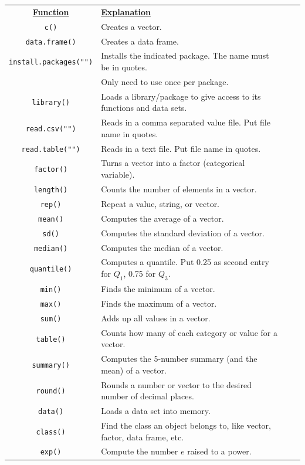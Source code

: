\documentclass[11pt]{article}
\begin{document}
\begin{longtable}{clcc}
	\underline{\bf Function} & \underline{\bf Explanation}\\
	\texttt{c()} & Creates a vector.\\
	\texttt{data.frame()} & Creates a data frame.\\
	\texttt{install.packages("")} & Installs the indicated package. The name must be in quotes.\\
	& Only need to use once per package.\\
	\texttt{library()} & Loads a library/package to give access to its functions and data sets.\\
	\texttt{read.csv("")} & Reads in a comma separated value file. Put file name in quotes.\\
	\texttt{read.table("")} & Reads in a text file. Put file name in quotes.\\
	\texttt{factor()} & Turns a vector into a factor (categorical variable).\\
	\texttt{length()} &  Counts the number of elements in a vector.\\
	\texttt{rep()} & Repeat a value, string, or vector.\\
	\texttt{mean()} & Computes the average of a vector.\\
	\texttt{sd()} & Computes the standard deviation of a vector. \\
	\texttt{median()} & Computes the median of a vector.\\
	\texttt{quantile()} & Computes a quantile. Put 0.25 as second entry for $Q_1$, 0.75 for $Q_3$.\\
	\texttt{min()} & Finds the minimum of a vector.\\
	\texttt{max()} & Finds the maximum of a vector.\\
	\texttt{sum()} & Adds up all values in a vector.\\
	\texttt{table()} & Counts how many of each category or value for a vector.\\
	\texttt{summary()} & Computes the 5-number summary (and the mean) of a vector.\\
	\texttt{round()} & Rounds a number or vector to the desired number of decimal places.\\
	\texttt{data()} & Loads a data set into memory.\\
	\texttt{class()} & Find the class an object belongs to, like vector, factor, data frame, etc.\\
	\texttt{exp()} & Compute the number $e$ raised to a power.\\

\end{longtable}
\end{document}
